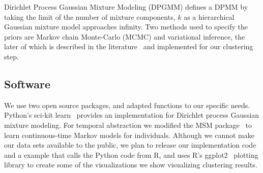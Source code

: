 Dirichlet Process Gaussian Mixture Modeling (DPGMM) defines a  DPMM by taking the limit of the number of mixture components, $k$ as a hierarchical Gaussian mixture model approaches infinity.  Two methods used to specify the priors are Markov chain Monte-Carlo (MCMC) and variational inference, the later of which is described in the literature~\cite{Blei04} and implemented for our clustering step.

\subsection{Software}
 We use two open source packages, and adapted functions to our specific needs.  Python's sci-kit learn~\cite{scikit} provides an implementation for Dirichlet process Gaussian mixture modeling.  For temporal abstraction we modified the MSM package~\cite{Jackson10} to learn continuous-time Markov models for individuals.  Although we cannot make our data sets available to the public, we plan to release our implementation code and a example that calls the Python code from R, and uses R's ggplot2~\cite{ggplot2} plotting library to create some of the visualizations we show visualizing clustering results.
